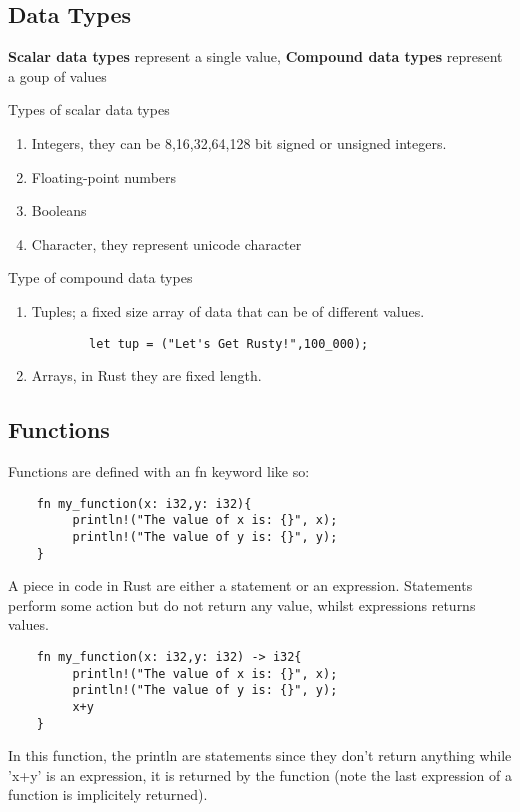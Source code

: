 \subsection{Data Types}
\begin{definition}
    \textbf{Scalar data types} represent a single value, \textbf{Compound data types} represent a goup of values
\end{definition}
Types of scalar data types\begin{enumerate}
    \item Integers, they can be 8,16,32,64,128 bit signed or unsigned integers.
    \item Floating-point numbers
    \item Booleans
    \item Character, they represent unicode character
\end{enumerate}
Type of compound data types\begin{enumerate}
    \item Tuples; a fixed size array of data that can be of different values.
    \begin{verbatim}
        let tup = ("Let's Get Rusty!",100_000);
    \end{verbatim}
    \item Arrays, in Rust they are fixed length.
\end{enumerate}
\subsection{Functions}
Functions are defined with an fn keyword like so:\begin{verbatim}
    fn my_function(x: i32,y: i32){
         println!("The value of x is: {}", x);
         println!("The value of y is: {}", y);
    }
\end{verbatim}

A piece in code in Rust are either a statement or an expression. Statements perform some action but do not return any value, whilst expressions returns values. 
\begin{verbatim}
    fn my_function(x: i32,y: i32) -> i32{
         println!("The value of x is: {}", x);
         println!("The value of y is: {}", y);
         x+y
    }
\end{verbatim}

In this function, the println are statements since they don't return anything while 'x+y' is an expression, it is returned by the function (note the last expression of a function is implicitely returned). 

